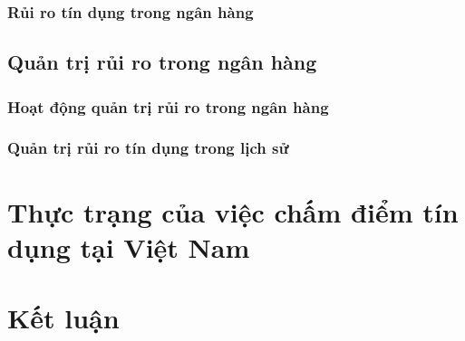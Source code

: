 \begin{comment}
Tín dụng là khái niệm thể hiện mối quan hệ giữa người cho vay và người vay. Trong quan hệ này, người cho vay có nhiệm vụ chuyển giao quyền sử dụng tiền hoặc hàng hoá cho vay cho người đi vay trong một thời gian nhất định. Người đi vay có nghĩa vụ trả số tiền hoặc giá trị hàng hoá đã vay khi đến hạn trả nợ có kèm hoặc không kèm theo một khoản lãi.

Tín dụng ngân hàng là quan hệ tín dụng giữa ngân hàng, các tổ chức tín dụng khác, với các nhà doanh nghiệp và cá nhân.
\end{comment}

\subsubsection{Rủi ro tín dụng trong ngân hàng}
\begin{comment}

Rủi ro tín dụng trong hoạt động NH là khả năng xảy ra tổn thất trong hoạt động NH do khách hàng không thực hiện hoặc không có khả năng thực hiện nghĩa vụ của mình theo cam kết. 
Rủi ro tín dụng được hiểu một cách đơn giản nhất đó là rủi ro không thu hồi được nợ khi đến hạn. Xuất phát từ hoạt động tín dụng khi khách hàng vay vi phạm các điều kiện của hợp đồng tín dụng làm giảm hay mất giá trị của tài sản có. Rủi ro tín dụng phát sinh trong trường hợp NH không thu được đầy đủ cả gốc lẫn lãi của khoản vay, hoặc là việc thanh toán nợ gốc và lãi không đúng kỳ hạn.

\end{comment}

\subsection{Quản trị rủi ro trong ngân hàng}
\subsubsection{Hoạt động quản trị rủi ro trong ngân hàng}
\subsubsection{Quản trị rủi ro tín dụng trong lịch sử}
\subsubsection{}
\section{Thực trạng của việc chấm điểm tín dụng tại Việt Nam}

\section{Kết luận}
